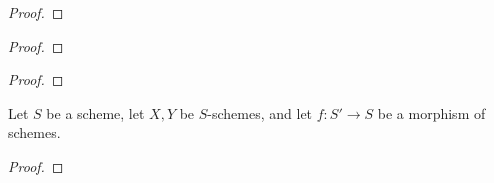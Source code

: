                     \begin{proof}
                        
                    \end{proof}
                \begin{lemma} \label{lemma: topological_criterion_for_(quasi)_separatedness}
                    
                \end{lemma}
                    \begin{proof}
                        
                    \end{proof}
                \begin{lemma} \label{lemma: algebraic_criterion_for_(quasi)_separatedness}
                    
                \end{lemma}
                    \begin{proof}
                        
                    \end{proof}
                \begin{proposition} \label{prop: (quasi)_separatedness_and_quasi_compactness}
                    Let $S$ be a scheme, let $X, Y$ be $S$-schemes, and let $f: S' \to S$ be a morphism of schemes. 
                \end{proposition}
                    \begin{proof}
                        
                    \end{proof}
                
